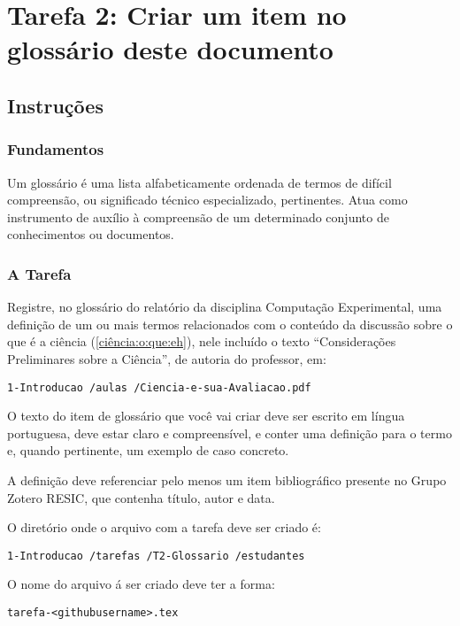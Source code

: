 \chapter{Tarefa 2: Criar um item no glossário deste documento \label{tarefa:glossario}}

\section{Instruções}

\subsection{Fundamentos}

Um glossário é uma lista alfabeticamente ordenada de termos de difícil compreensão, ou significado técnico especializado, pertinentes. Atua como instrumento de auxílio à compreensão de 
um determinado conjunto de conhecimentos ou documentos.
 
\subsection{A Tarefa}

Registre, no glossário do relatório da disciplina Computação Experimental, uma definição de um ou mais termos relacionados com o conteúdo da discussão sobre o que é a ciência (\ref{ciência:o:que:eh}), nele incluído o texto ``Considerações Preliminares sobre a Ciência'', de autoria do professor, em:
\begin{verbatim}
1-Introducao /aulas /Ciencia-e-sua-Avaliacao.pdf
\end{verbatim}

O texto do item de glossário que você vai criar deve ser escrito em língua portuguesa, deve estar claro e compreensível, e conter uma definição para o termo e, quando pertinente, um exemplo de caso concreto.

A definição deve referenciar pelo menos um item bibliográfico presente no Grupo Zotero RESIC, que contenha título, autor e data.


O diretório onde o arquivo com a tarefa deve ser criado é: 
\begin{verbatim}
1-Introducao /tarefas /T2-Glossario /estudantes    
\end{verbatim}

O nome do arquivo á ser criado deve ter a forma:
\begin{verbatim}
tarefa-<githubusername>.tex
\end{verbatim}

